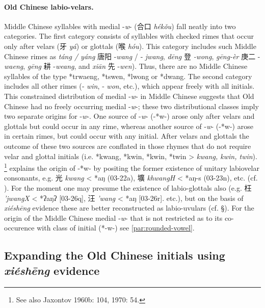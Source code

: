 \paragraph{Old Chinese
labio-velars.} Middle Chinese syllables with medial -\emph{w}- (合口
 \emph{hékǒu}) fall neatly into two categories. The first category
consists of syllables with checked rimes that occur only after velars
(牙 \emph{yá}) or glottals (喉  \emph{hóu}). This category includes such
Middle Chinese rimes as \emph{táng / yáng} 唐阳 -\emph{wang} /
‑ \emph{jwang},  \emph{dēng} 登 \emph{-wong},  \emph{gēng-èr} 庚二
-\emph{waeng},  \emph{gēng} 耕 -\emph{weang}, and \emph{xiān} 先
-\emph{wen}). Thus, there are no Middle Chinese syllables of the type
*trwaeng, *tswen, *lwong or *dwang. The second category includes all
other rimes (‑ \emph{win}, ‑ \emph{won}, etc.), which appear freely with
all initials. This constrained distribution of medial -\emph{w}- in
Middle Chinese suggests that Old Chinese had no freely occurring medial
-\emph{w}-; these two distributional classes imply two separate origins
for -\emph{w}-. One source of -\emph{w}- (-*w{}-) arose only after velars
and glottals but could occur in any rime, whereas another source of
-\emph{w}- (-*w{}-) arose in certain rimes, but could occur with any
initial. After velars and glottals the outcome of these two sources are
conflated in those rhymes that do not require velar and glottal initials
(i.e. *kw{}ang, *kw{}in, *kw{}in, *tw{}in \textgreater{} \emph{kwang, kwin,
twin}). 
\citet[359]{Haudricourt1954b}\footnote{See also Jaxontov 1960b: 104, 1970: 54.}
explains the origin of -*w{}- by positing the former existence of unitary
labiovelar consonants, e.g. 光 \emph{kwang} \textless{} *{}aŋ (03-22a),
壙 \emph{khwangH} \textless{} *{}aŋ-s (03-23n), etc. (cf. \cite[214-218]{Baxter1992}). For the moment one may presume the existence of labio-glottals
also (e.g. 枉 \emph{'jwangX} \textless{} *ʔ{}aŋʔ {[}03-26q], 汪
 \emph{'wang} \textless{} *{}aŋ {[}03-26r]. etc.), but on the basis of
 \emph{xiéshēng} evidence these are better reconstructed as labio-uvulars
(cf. §). For the origin of the Middle Chinese medial -\emph{w}- that is
not restricted as to its co-occurence with class of initial (*-w{}-) see \ref{par:rounded-vowel}.

\subsection{\texorpdfstring{Expanding the Old Chinese initials using
 \emph{xiéshēng}
evidence}{Expanding the Old Chinese initials using xiéshēng evidence}}\label{expanding-the-old-chinese-initials-using-xiuxe9shux113ng-evidence}

